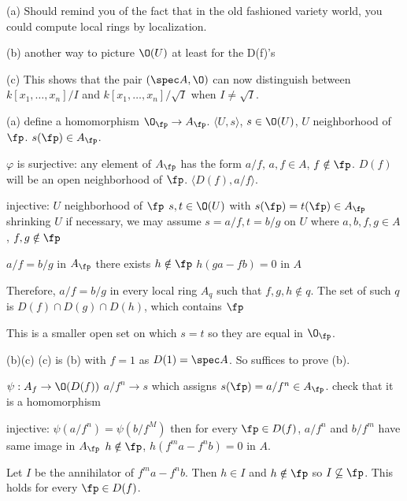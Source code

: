 \begin{rem}
(a) Should remind you of the fact that in the old fashioned variety world, you could compute local rings by localization. 

(b) another way to picture $\O(U)$ at least for the D(f)'s

(c) This shows that the pair $(\spec A, \O)$ can now distinguish between $k[x_1,\ldots,x_n]/I$ and $k[x_1,\ldots,x_n]/\sqrt{I}$ when $I \neq \sqrt{I}$. 
\end{rem}


\pf
(a) define a homomorphism $\O_\fp \to A_\fp$. 
$\langle U,s \rangle$, $s \in \O(U)$, $U$ neighborhood of $\fp$. 
$s(\fp) \in A_\fp$. 

$\varphi$ is surjective:
any element of $A_\fp$ has the form $a/f$, $a,f \in A$, $f \notin \fp$.
$D(f)$ will be an open neighborhood of $\fp$.
$\langle D(f), a/f \rangle$. 

injective: 
$U$ neighborhood of $\fp$
$s,t \in \O(U)$ with 
$s(\fp)= t(\fp) \in A_\fp$
shrinking $U$ if necessary, we may assume
$s= a/f, t= b/g$ on $U$
where $a,b,f,g \in A$, $f,g \notin \fp$

$a/f= b/g$ in $A_\fp$
there exists $h \notin \fp$
$h(ga-fb)=0$ in $A$

Therefore, $a/f= b/g$ in every local ring $A_q$
such that $f,g,h \notin q$.
The set of such $q$ is 
$D(f) \cap D(g) \cap D(h)$, which contains $\fp$

This is a smaller open set on which $s=t$
so they are equal in $\O_\fp$.

(b)(c)
(c) is (b) with $f=1$ as $D(1)= \spec A$. 
So suffices to prove (b).

$\psi: A_f \to \O(D(f))$
$a/f^n \to s$ which assigns $s(\fp)= a/f^n \in A_\fp$. 
check that it is a homomorphism

injective: $\psi(a/f^n)= \psi(b/f^M)$ then
for every $\fp \in D(f)$, $a/f^n$ and $b/f^m$
have same image in $A_\fp$
$h \notin \fp$, $h(f^ma - f^nb)= 0$ in $A$.

Let $I$ be the annihilator of $f^ma - f^nb$. Then $h \in I$ and $h \notin \fp$ so $I \not\subseteq \fp$. This holds for every $\fp \in D(f)$. 






























